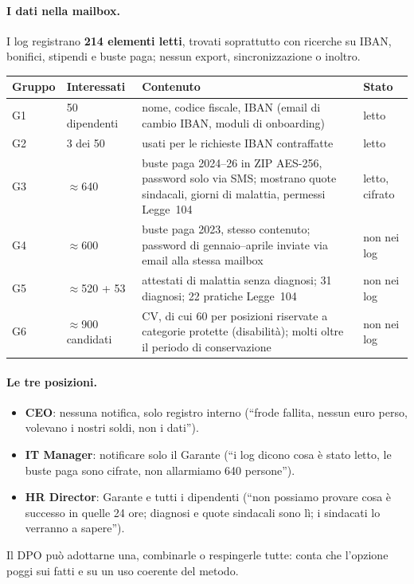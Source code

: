 \paragraph{I dati nella mailbox.} I log registrano \textbf{214 elementi letti}, trovati soprattutto con
ricerche su IBAN, bonifici, stipendi e buste paga; nessun export, sincronizzazione o inoltro.
\begin{center}
\small
\begin{tabularx}{\linewidth}{l l X l}
\toprule
\textbf{Gruppo} & \textbf{Interessati} & \textbf{Contenuto} & \textbf{Stato} \\ \midrule
G1 & 50 dipendenti & nome, codice fiscale, IBAN (email di cambio IBAN, moduli di onboarding) & letto \\
G2 & 3 dei 50 & usati per le richieste IBAN contraffatte & letto \\
G3 & $\approx$640 & buste paga 2024--26 in ZIP AES-256, password solo via SMS; mostrano quote
  sindacali, giorni di malattia, permessi Legge~104 & letto, cifrato \\
G4 & $\approx$600 & buste paga 2023, stesso contenuto; password di gennaio--aprile inviate via email alla
  stessa mailbox & non nei log \\
G5 & $\approx$520 + 53 & attestati di malattia senza diagnosi; 31 diagnosi; 22 pratiche Legge~104 &
  non nei log \\
G6 & $\approx$900 candidati & CV, di cui 60 per posizioni riservate a categorie protette (disabilità);
  molti oltre il periodo di conservazione & non nei log \\
\bottomrule
\end{tabularx}
\end{center}

\paragraph{Le tre posizioni.}
\begin{itemize}
  \item \textbf{CEO}: nessuna notifica, solo registro interno (``frode fallita, nessun euro perso,
    volevano i nostri soldi, non i dati'').
  \item \textbf{IT Manager}: notificare solo il Garante (``i log dicono cosa è stato letto, le buste
    paga sono cifrate, non allarmiamo 640 persone'').
  \item \textbf{HR Director}: Garante e tutti i dipendenti (``non possiamo provare cosa è successo in
    quelle 24 ore; diagnosi e quote sindacali sono lì; i sindacati lo verranno a sapere'').
\end{itemize}
Il DPO può adottarne una, combinarle o respingerle tutte: conta che l'opzione poggi sui fatti e su un
uso coerente del metodo.

